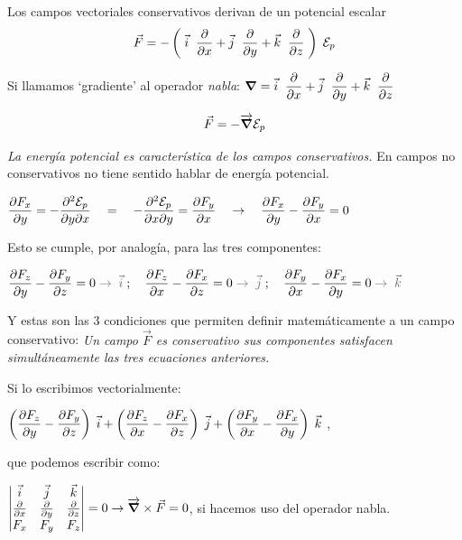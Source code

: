 \begin{small}
\begin{myexampleblock}{Los campos vectoriales conservativos derivan de un potencial escalar}
\vspace{2mm}
\begin{equation}
\displaystyle \vec F=- \left( \;\vec i\;\;\pdv{x} + \vec j\;\;\pdv{y} + \vec k\;\;\pdv{z}\; \right)\; \mathcal E_p
\end{equation}

\vspace{2mm}
Si llamamos `gradiente' al operador \emph{nabla}: $\displaystyle \grad= \vec i\;\;\pdv{x} + \vec j\;\;\pdv{y} + \vec k\;\;\pdv{z}$

\vspace{2mm}
\begin{equation}
\label{Ep-gradiente}
\vec F=-\overrightarrow{ \grad } \mathcal E_p	
\end{equation}

\vspace{2mm}
\emph{La energía potencial es característica de los campos conservativos.} 
En campos no conservativos no tiene sentido hablar de energía potencial.

\vspace{2mm}
$\displaystyle \pdv{F_x}{y}=-\pdv{\mathcal E_p}{y}{x} \quad = \quad -\pdv{\mathcal E_p}{x}{y}=\pdv{F_y}{x} \quad \to \quad \pdv{F_x}{y}-\pdv{F_y}{x}=0$ 

\vspace{2mm} Esto se cumple, por analogía, para las tres componentes:

\vspace{2mm} $\displaystyle \pdv{F_z}{y}-\pdv{F_y}{z}=0 \; \textcolor{gris}{\to\;  \vec i}\;;\quad \pdv{F_z}{x}-\pdv{F_x}{z}=0 \;\textcolor{gris}{\to\;  \vec j}\;;\quad \pdv{F_y}{x}-\pdv{F_x}{y}=0 \;\textcolor{gris}{\to\;  \vec k}$

\vspace{2mm} Y estas son las 3 condiciones que permiten definir matemáticamente a un campo conservativo: \emph{Un campo $\vec F$ es conservativo sus componentes satisfacen simultáneamente las tres ecuaciones anteriores.}

\vspace{2mm} Si lo escribimos vectorialmente:

\vspace{2mm} $\displaystyle \left( \pdv{F_z}{y}-\pdv{F_y}{z} \right) \;  \vec i+
\left( \pdv{F_z}{x}-\pdv{F_x}{z} \right) \;  \vec j+
\left( \pdv{F_y}{x}-\pdv{F_x}{y} \right) \;  \vec k\;$,

\vspace{2mm} que podemos escribir como:

\vspace{2mm} $\displaystyle \left| \begin{matrix} \vec i&\vec j&\vec k \\ \pdv{x}&\pdv{y}&\pdv{z} \\ F_x&F_y&F_z  \end{matrix} \right|=0 \to \overrightarrow{\grad } \times \vec F = 0$, si hacemos uso del operador nabla.


\end{myexampleblock}
\end{small}
